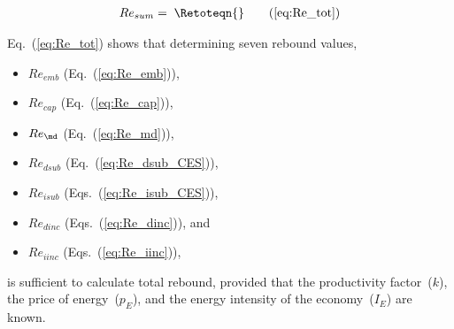 \begin{align}
  Re_{sum} = \; \Retoteqn{} \tag{\ref{eq:Re_tot}}
\end{align}

Eq.~(\ref{eq:Re_tot}) shows that determining seven rebound values,

\begin{itemize}

  \item $Re_{emb}$ (Eq.~(\ref{eq:Re_emb})), 

  \item $Re_{cap}$ (Eq.~(\ref{eq:Re_cap})), 
  
  \item $Re_{\md}$ (Eq.~(\ref{eq:Re_md})),
  
  \item $Re_{dsub}$ (Eq.~(\ref{eq:Re_dsub_CES})),
  
  \item $Re_{isub}$ (Eqs.~(\ref{eq:Re_isub_CES})), 
  
  \item $Re_{dinc}$ (Eqs.~(\ref{eq:Re_dinc})), and
  
  \item $Re_{iinc}$ (Eqs.~(\ref{eq:Re_iinc})),

\end{itemize}
%
is sufficient to calculate total rebound, 
provided that 
the productivity factor~($k$),
the price of energy~($p_E$), and
the energy intensity of the economy~($I_E$) 
are known.
